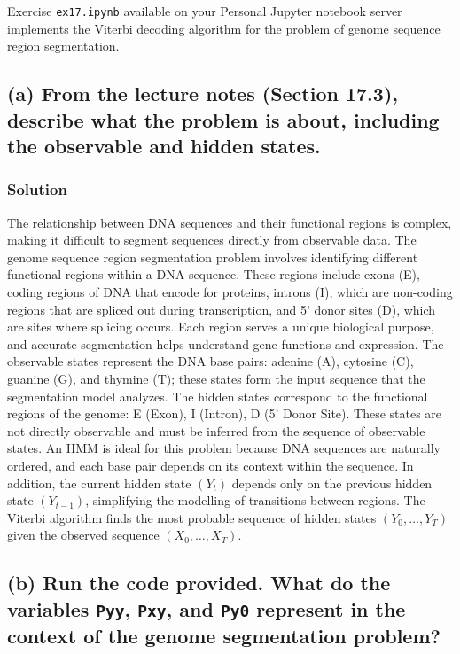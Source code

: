 Exercise \texttt{ex17.ipynb} available on your Personal Jupyter notebook server implements the Viterbi decoding
algorithm for the problem of genome sequence region segmentation.

\subsection*{(a) From the lecture notes (Section 17.3), describe what the problem is about, including the observable and hidden states.}

\subsubsection*{Solution}

The relationship between DNA sequences and their functional regions is complex, making it
difficult to segment sequences directly from observable data. The genome sequence region
segmentation problem involves identifying different functional regions within a DNA sequence.
These regions include exons (E), coding regions of DNA that encode for proteins, introns (I),
which are non-coding regions that are spliced out during transcription, and 5’ donor sites (D),
which are sites where splicing occurs.  Each region serves a unique biological purpose, and
accurate segmentation helps understand gene functions and expression.  The observable states
represent the DNA base pairs: adenine (A), cytosine (C), guanine (G), and thymine (T); these
states form the input sequence that the segmentation model analyzes.  The hidden states
correspond to the functional regions of the genome: E (Exon), I (Intron), D (5’ Donor
Site).  These states are not directly observable and must be inferred from the sequence of
observable states.  An HMM is ideal for this problem because DNA sequences are naturally
ordered, and each base pair depends on its context within the sequence.  In addition, the
current hidden state $(Y_t)$ depends only on the previous hidden state $(Y_{t-1})$, simplifying
the modelling of transitions between regions.  The Viterbi algorithm finds the most probable
sequence of hidden states $(Y_0,\dots,Y_T)$ given the observed sequence $(X_0,\dots,X_T)$.

\subsection*{(b) Run the code provided. What do the variables \texttt{Pyy}, \texttt{Pxy}, and \texttt{Py0} represent in the context of the genome segmentation problem?}

